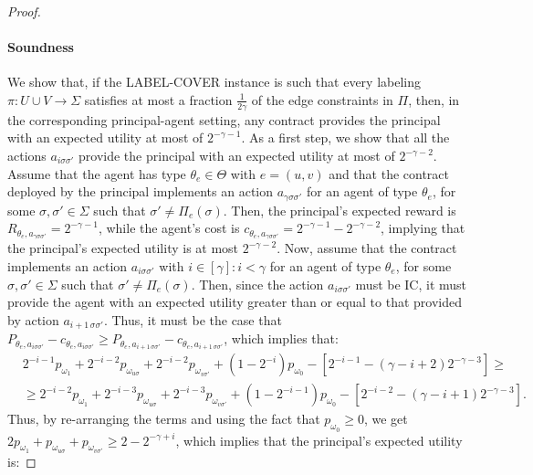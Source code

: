 \begin{proof}
	\paragraph{Soundness}
	We show that, if the \textsf{LABEL-COVER} instance is such that every labeling $\pi : U \cup V \to \Sigma$ satisfies at most a fraction $\frac{1}{2\gamma}$ of the edge constraints in $\Pi$, then, in the corresponding principal-agent setting, any contract provides the principal with an expected utility at most of $2^{-\gamma-1}$.
	As a first step, we show that all the actions $a_{i \sigma \sigma'}$ provide the principal with an expected utility at most of $2^{-\gamma-2}$.
	Assume that the agent has type $\theta_{e} \in \Theta$ with $e = (u,v)$ and that the contract deployed by the principal implements an action $a_{\gamma \sigma \sigma'}$ for an agent of type $\theta_{e}$, for some $\sigma, \sigma' \in \Sigma$ such that $\sigma' \neq \Pi_e(\sigma)$.
	Then, the principal's expected reward is $R_{\theta_{e}, a_{\gamma \sigma \sigma'}} = 2^{-\gamma-1}$, while the agent's cost is $c_{\theta_{e}, a_{\gamma \sigma \sigma'}} = 2^{-\gamma-1}-2^{-\gamma-2}$, implying that the principal's expected utility is at most $2^{-\gamma-2}$.
	Now, assume that the contract implements an action $a_{i \sigma \sigma'}$ with $i \in [\gamma] : i < \gamma$ for an agent of type $\theta_{e}$, for some $\sigma, \sigma' \in \Sigma$ such that $\sigma' \neq \Pi_e(\sigma)$.
	Then, since the action $a_{i \sigma \sigma'}$ must be IC, it must provide the agent with an expected utility greater than or equal to that provided by action $a_{i+1 \, \sigma \sigma'}$.
	Thus, it must be the case that $P_{\theta_e, a_{i \sigma \sigma'}} - c_{\theta_e, a_{i \sigma \sigma'}} \geq P_{\theta_e, a_{i+1 \, \sigma \sigma'}} - c_{\theta_e, a_{i+1 \,  \sigma \sigma'}} $, which implies that:
	\begin{align*}
		&2^{-i-1} p_{\omega_1} + 2^{-i-2} p_{\omega_{u\sigma}} +2^{-i-2} p_{\omega_{v \sigma'}} + \left( 1-2^{-i} \right) p_{ \omega_0}    - \left[ 2^{-i-1}-(\gamma-i+2) 2^{-\gamma-3} \right]\ge\\
		& \geq 2^{-i-2} p_{\omega_1}+ 2^{-i-3} p_{\omega_{u \sigma}} +2^{-i-3} p_{\omega_{v \sigma'}} +  \left( 1-2^{-i-1} \right) p_{\omega_0}  - \left[ 2^{-i-2}-(\gamma-i+1) 2^{-\gamma-3} \right].
	\end{align*}
	Thus, by re-arranging the terms and using the fact that $p_{\omega_0} \geq 0$, we get $2 p_{\omega_1}+ p_{\omega_{u \sigma}} +p_{\omega_{v \sigma'}} \ge 2- 2^{-\gamma+i}$, which implies that the principal's expected utility is:

\end{proof}
